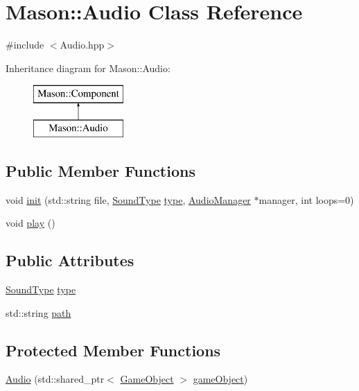 \hypertarget{class_mason_1_1_audio}{}\section{Mason\+:\+:Audio Class Reference}
\label{class_mason_1_1_audio}


{\ttfamily \#include $<$Audio.\+hpp$>$}

Inheritance diagram for Mason\+:\+:Audio\+:\begin{figure}[H]
\begin{center}
\leavevmode
\includegraphics[height=2.000000cm]{class_mason_1_1_audio}
\end{center}
\end{figure}
\subsection*{Public Member Functions}
\begin{DoxyCompactItemize}
\item 
void \hyperlink{class_mason_1_1_audio_a5d4f318f5bee0b59d1a4289495b01b4c}{init} (std\+::string file, \hyperlink{namespace_mason_a158d651086d1ba1aacc4c37125b27657}{Sound\+Type} \hyperlink{class_mason_1_1_audio_a100d9da58685f865bf03dcf44a55fb63}{type}, \hyperlink{class_mason_1_1_audio_manager}{Audio\+Manager} $\ast$manager, int loops=0)
\item 
void \hyperlink{class_mason_1_1_audio_a2916f9015031bee9abb98adf0d83e7ee}{play} ()
\end{DoxyCompactItemize}
\subsection*{Public Attributes}
\begin{DoxyCompactItemize}
\item 
\hyperlink{namespace_mason_a158d651086d1ba1aacc4c37125b27657}{Sound\+Type} \hyperlink{class_mason_1_1_audio_a100d9da58685f865bf03dcf44a55fb63}{type}
\item 
std\+::string \hyperlink{class_mason_1_1_audio_a762cc6174ce20a011fe1e3a36e649204}{path}
\end{DoxyCompactItemize}
\subsection*{Protected Member Functions}
\begin{DoxyCompactItemize}
\item 
\hyperlink{class_mason_1_1_audio_aa65245dcba1c0a373b7130e7e36306c2}{Audio} (std\+::shared\+\_\+ptr$<$ \hyperlink{class_mason_1_1_game_object}{Game\+Object} $>$ \hyperlink{class_mason_1_1_component_abaa67b569d0a70e26a4606f4a099a925}{game\+Object})
\end{DoxyCompactItemize}
